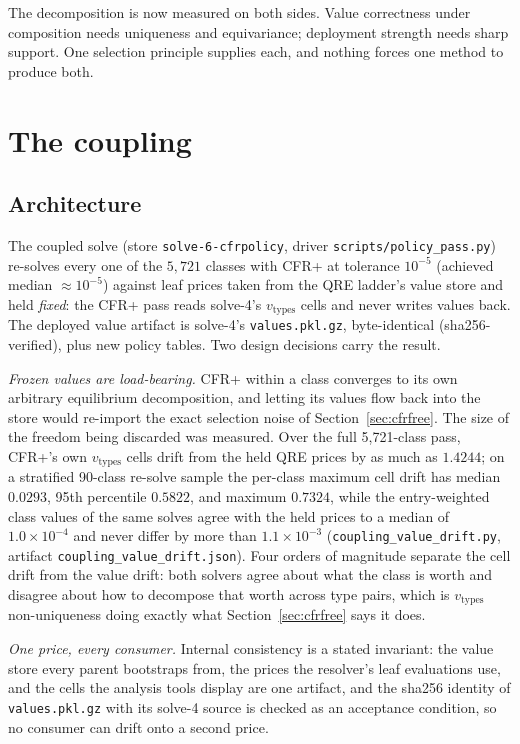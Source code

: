 \documentclass[11pt]{article}
\theoremstyle{plain}
\theoremstyle{definition}
\theoremstyle{remark}
\newcommand{\code}[1]{\texttt{\small #1}}
\newcommand{\vtypes}{\ensuremath{v_{\mathrm{types}}}}
\begin{document}
The decomposition is now measured on both sides. Value correctness
under composition needs uniqueness and equivariance; deployment
strength needs sharp support. One selection principle supplies each,
and nothing forces one method to produce both.

\section{The coupling}\label{sec:coupling}

\subsection{Architecture}

The coupled solve (store \code{solve-6-cfrpolicy}, driver
\code{scripts/policy\_pass.py}) re-solves every one of the $5{,}721$
classes with CFR+ at tolerance $10^{-5}$ (achieved median
$\approx10^{-5}$) against leaf prices taken from the QRE ladder's value
store and held \emph{fixed}: the CFR+ pass reads solve-4's $\vtypes$
cells and never writes values back. The deployed value artifact is
solve-4's \code{values.pkl.gz}, byte-identical (sha256-verified), plus
new policy tables. Two design decisions carry the result.

\emph{Frozen values are load-bearing.} CFR+ within a class converges to
its own arbitrary equilibrium decomposition, and letting its values
flow back into the store would re-import the exact selection noise of
Section~\ref{sec:cfrfree}. The size of the freedom being discarded was
measured. Over the full 5{,}721-class pass, CFR+'s own $\vtypes$ cells
drift from the held QRE prices by as much as $1.4244$; on a stratified
90-class re-solve sample the per-class maximum cell drift has median
$0.0293$, 95th percentile $0.5822$, and maximum $0.7324$, while the
entry-weighted class values of the same solves agree with the held
prices to a median of $1.0\times10^{-4}$ and never differ by more than
$1.1\times10^{-3}$ (\code{coupling\_value\_drift.py}, artifact
\code{coupling\_value\_drift.json}). Four orders of magnitude separate
the cell drift from the value drift: both solvers agree about what the
class is worth and disagree about how to decompose that worth across
type pairs, which is $\vtypes$ non-uniqueness doing exactly what
Section~\ref{sec:cfrfree} says it does.

\emph{One price, every consumer.} Internal consistency is a stated
invariant: the value store every parent bootstraps from, the prices the
resolver's leaf evaluations use, and the cells the analysis
tools display are one artifact, and the sha256 identity of
\code{values.pkl.gz} with its solve-4 source is checked as an
acceptance condition, so no consumer can drift onto a second price.
\end{document}
